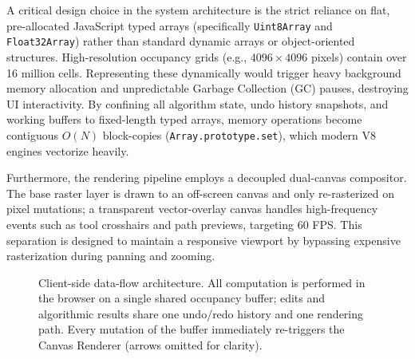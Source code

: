 \documentclass[journal]{IEEEtran}
\begin{document}
A critical design choice in the system architecture is the strict reliance on flat, pre-allocated JavaScript typed arrays (specifically \texttt{Uint8Array} and \texttt{Float32Array}) rather than standard dynamic arrays or object-oriented structures. High-resolution occupancy grids (e.g., $4096 \times 4096$ pixels) contain over 16 million cells. Representing these dynamically would trigger heavy background memory allocation and unpredictable Garbage Collection (GC) pauses, destroying UI interactivity. By confining all algorithm state, undo history snapshots, and working buffers to fixed-length typed arrays, memory operations become contiguous $O(N)$ block-copies (\texttt{Array.prototype.set}), which modern V8 engines vectorize heavily. 

Furthermore, the rendering pipeline employs a decoupled dual-canvas compositor. The base raster layer is drawn to an off-screen canvas and only re-rasterized on pixel mutations; a transparent vector-overlay canvas handles high-frequency events such as tool crosshairs and path previews, targeting 60 FPS. This separation is designed to maintain a responsive viewport by bypassing expensive rasterization during panning and zooming.

\begin{figure}[t]
\centering
{}
\caption{Client-side data-flow architecture. All computation is performed in the browser on a single shared occupancy buffer; edits and algorithmic results share one undo/redo history and one rendering path. Every mutation of the buffer immediately re-triggers the Canvas Renderer (arrows omitted for clarity).}
\label{fig:architecture}
\vspace{-3mm}
\end{figure}
\end{document}
